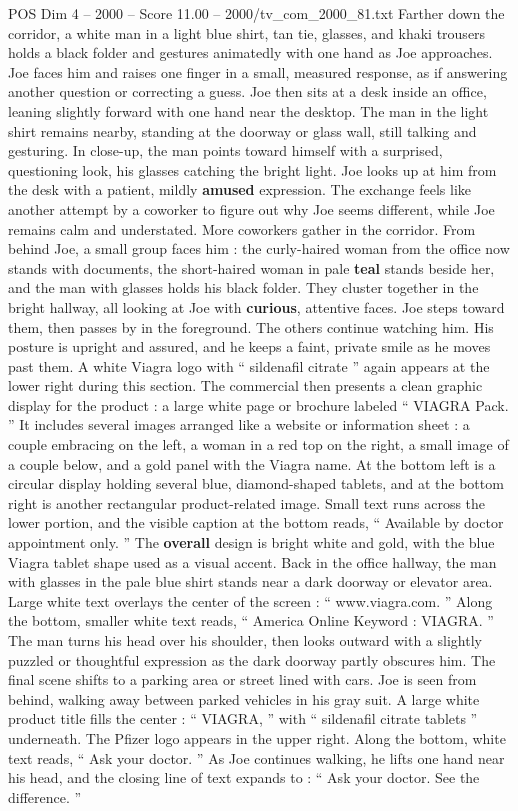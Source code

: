 \begin{textsample}{POS Dim 4 – 2000 – Score 11.00 – 2000/tv\_com\_2000\_81.txt}
Farther down the corridor, a white man in a light blue shirt, tan tie, glasses, and khaki trousers holds a black folder and gestures animatedly with one hand as Joe approaches.
Joe faces him and raises one finger in a small, measured response, as if answering another question or correcting a guess.
Joe then sits at a desk inside an office, leaning slightly forward with one hand near the desktop.
The man in the light shirt remains nearby, standing at the doorway or glass wall, still talking and gesturing.
In close-up, the man points toward himself with a surprised, questioning look, his glasses catching the bright light.
Joe looks up at him from the desk with a patient, mildly \textbf{amused} expression.
The exchange feels like another attempt by a coworker to figure out why Joe seems different, while Joe remains calm and understated.
More coworkers gather in the corridor.
From behind Joe, a small group faces him : the curly-haired woman from the office now stands with documents, the short-haired woman in pale \textbf{teal} stands beside her, and the man with glasses holds his black folder.
They cluster together in the bright hallway, all looking at Joe with \textbf{curious}, attentive faces.
Joe steps toward them, then passes by in the foreground.
The others continue watching him.
His posture is upright and assured, and he keeps a faint, private smile as he moves past them.
A white Viagra logo with “ sildenafil citrate ” again appears at the lower right during this section.
The commercial then presents a clean graphic display for the product : a large white page or brochure labeled “ VIAGRA Pack. ” It includes several images arranged like a website or information sheet : a couple embracing on the left, a woman in a red top on the right, a small image of a couple below, and a gold panel with the Viagra name.
At the bottom left is a circular display holding several blue, diamond-shaped tablets, and at the bottom right is another rectangular product-related image.
Small text runs across the lower portion, and the visible caption at the bottom reads, “ Available by doctor appointment only. ” The \textbf{overall} design is bright white and gold, with the blue Viagra tablet shape used as a visual accent.
Back in the office hallway, the man with glasses in the pale blue shirt stands near a dark doorway or elevator area.
Large white text overlays the center of the screen : “ www.viagra.com. ” Along the bottom, smaller white text reads, “ America Online Keyword : VIAGRA. ” The man turns his head over his shoulder, then looks outward with a slightly puzzled or thoughtful expression as the dark doorway partly obscures him.
The final scene shifts to a parking area or street lined with cars.
Joe is seen from behind, walking away between parked vehicles in his gray suit.
A large white product title fills the center : “ VIAGRA, ” with “ sildenafil citrate tablets ” underneath.
The Pfizer logo appears in the upper right.
Along the bottom, white text reads, “ Ask your doctor. ” As Joe continues walking, he lifts one hand near his head, and the closing line of text expands to : “ Ask your doctor.
See the difference. ”

\end{textsample}
